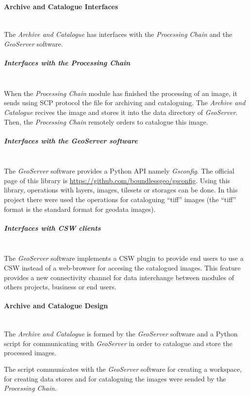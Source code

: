 \paragraph{Archive and Catalogue Interfaces}~\\

The \emph{Archive and Catalogue} has interfaces with the \emph{Processing Chain}
and the \emph{GeoServer} software. 

\subparagraph{Interfaces with the Processing Chain}~\\

When the \emph{Processing Chain} module has finished the processing of an image,
it sends using \ac{SCP} protocol the file for archiving and cataloguing. The
\emph{Archive and Catalogue} recives the image and stores it into the data
directory of \emph{GeoServer}. Then, the \emph{Processing Chain} remotely orders
to catalogue this image.  

\subparagraph{Interfaces with the GeoServer software}~\\

The \emph{GeoServer} software provides a Python \ac{API} namely
\emph{Gsconfig}. The official page of this library is
\url{https://github.com/boundlessgeo/gsconfig}. Using this library, operations
with layers, images, tilesets or storages can be done. In this project there
were used the operations for cataloguing ``tiff'' images (the ``tiff'' format is
the standard format for geodata images).

\subparagraph{Interfaces with CSW clients}~\\

The \emph{GeoServer} software implements a \ac{CSW} plugin to provide end users
to use a \ac{CSW} instead of a web-browser for accesing the catalogued images.
This feature provides a new connectivity channel for data interchange between
modules of others projects, business or end users.

\paragraph{Archive and Catalogue Design}~\\

The \emph{Archive and Catalogue} is formed by the \emph{GeoServer} software and
a Python script for communicating with \emph{GeoServer} in order to catalogue
and store the processed images.

The script communicates with the \emph{GeoServer} software for creating a
workspace, for creating data stores and for cataloguing the images were sended
by the \emph{Processing Chain}. 


